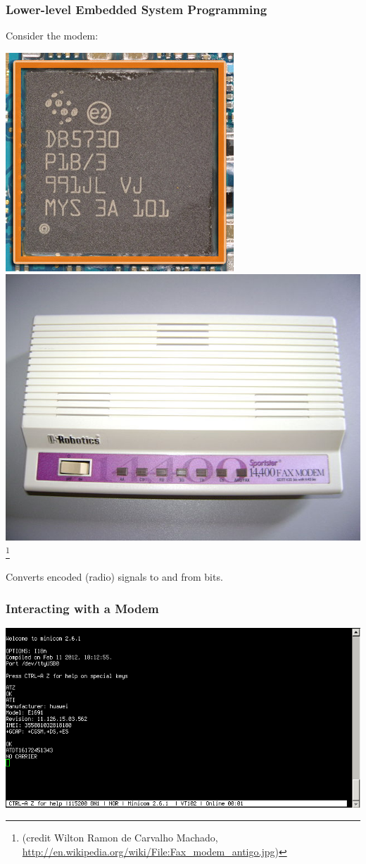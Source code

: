 \begin{frame}
\frametitle{Lower-level Embedded System Programming}

Consider the modem:

\begin{center}
\includegraphics[width=.45\textwidth]{images/modem.jpg}
\includegraphics[width=.45\textwidth]{images/640px-Fax_modem_antigo.jpg}\footnote{(credit Wilton Ramon de Carvalho Machado,
\url{http://en.wikipedia.org/wiki/File:Fax_modem_antigo.jpg})}
\end{center}

Converts encoded (radio) signals to and from bits.

\end{frame}

\begin{frame}
\frametitle{Interacting with a Modem}
\begin{center}
\includegraphics[width=.9\textwidth]{images/modem-interaction.png}
\end{center}

\end{frame}


